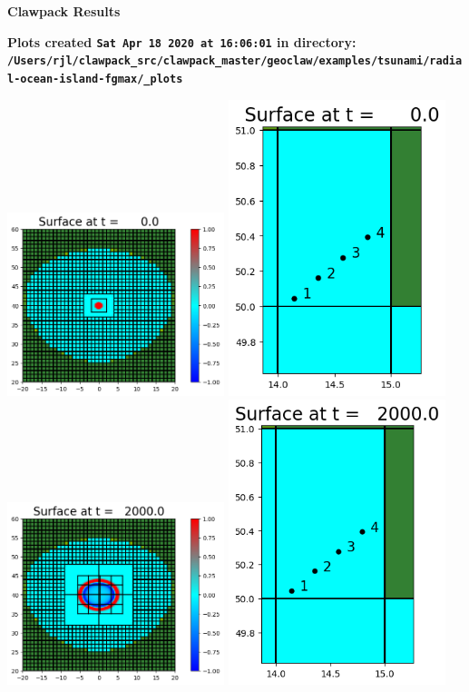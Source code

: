 \documentclass[11pt]{article}
\begin{document}
        \begin{center}{\Large\bf Clawpack Results}\vskip 5pt
        
        \bf Plots created {\tt Sat Apr 18 2020 at 16:06:01} in directory: \vskip 5pt
        \verb+/Users/rjl/clawpack_src/clawpack_master/geoclaw/examples/tsunami/radial-ocean-island-fgmax/_plots+
        \end{center}
        \vskip 5pt
        \includegraphics[width=0.475\textwidth]{frame0000fig0.png}
\includegraphics[width=0.475\textwidth]{frame0000fig7.png}
\vskip 10pt 
\includegraphics[width=0.475\textwidth]{frame0001fig0.png}
\includegraphics[width=0.475\textwidth]{frame0001fig7.png}
\end{document}
